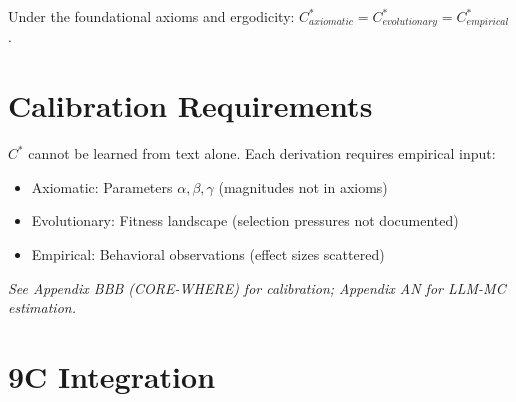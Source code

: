\begin{theorem}
Under the foundational axioms and ergodicity:
$C^*_{axiomatic} = C^*_{evolutionary} = C^*_{empirical}$.
\end{theorem}



\section{Calibration Requirements}
\label{sec:cstar-calibration}

$C^*$ cannot be learned from text alone. Each derivation requires empirical input:
\begin{itemize}[nosep]
    \item Axiomatic: Parameters $\alpha, \beta, \gamma$ (magnitudes not in axioms)
    \item Evolutionary: Fitness landscape (selection pressures not documented)
    \item Empirical: Behavioral observations (effect sizes scattered)
\end{itemize}

\emph{See Appendix BBB (CORE-WHERE) for calibration; Appendix AN for LLM-MC estimation.}



\section{9C Integration}
\label{sec:cstar-integration}

